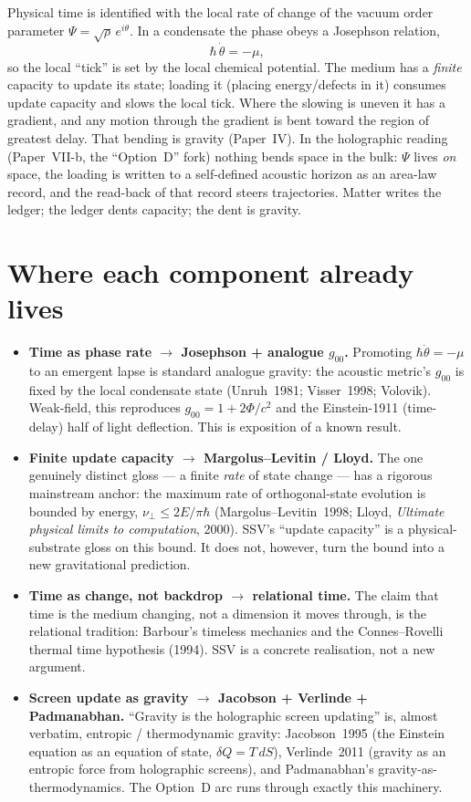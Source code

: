 \documentclass[11pt]{article}
\begin{document}
Physical time is identified with the local rate of change of the vacuum order
parameter $\Psi=\sqrt{\rho}\,e^{i\theta}$. In a condensate the phase obeys a
Josephson relation,
\begin{equation}
  \hbar\,\dot\theta = -\mu ,
\end{equation}
so the local ``tick'' is set by the local chemical potential. The medium has a
\emph{finite} capacity to update its state; loading it (placing energy/defects in
it) consumes update capacity and slows the local tick. Where the slowing is
uneven it has a gradient, and any motion through the gradient is bent toward the
region of greatest delay. That bending is gravity (Paper~IV). In the holographic
reading (Paper~VII-b, the ``Option~D'' fork) nothing bends space in the bulk:
$\Psi$ lives \emph{on} space, the loading is written to a self-defined acoustic
horizon as an area-law record, and the read-back of that record steers
trajectories. Matter writes the ledger; the ledger dents capacity; the dent is
gravity.

\section{Where each component already lives}

\begin{itemize}[leftmargin=1.4em]
\item \textbf{Time as phase rate $\to$ Josephson + analogue $g_{00}$.} Promoting
  $\hbar\dot\theta=-\mu$ to an emergent lapse is standard analogue gravity: the
  acoustic metric's $g_{00}$ is fixed by the local condensate state
  (Unruh~1981; Visser~1998; Volovik). Weak-field, this reproduces
  $g_{00}=1+2\Phi/c^2$ and the Einstein-1911 (time-delay) half of light
  deflection. This is exposition of a known result.
\item \textbf{Finite update capacity $\to$ Margolus--Levitin / Lloyd.} The one
  genuinely distinct gloss --- a finite \emph{rate} of state change --- has a
  rigorous mainstream anchor: the maximum rate of orthogonal-state evolution is
  bounded by energy, $\nu_\perp \le 2E/\pi\hbar$ (Margolus--Levitin~1998;
  Lloyd, \emph{Ultimate physical limits to computation}, 2000). SSV's ``update
  capacity'' is a physical-substrate gloss on this bound. It does not, however,
  turn the bound into a new gravitational prediction.
\item \textbf{Time as change, not backdrop $\to$ relational time.} The claim that
  time is the medium changing, not a dimension it moves through, is the
  relational tradition: Barbour's timeless mechanics and the Connes--Rovelli
  thermal time hypothesis (1994). SSV is a concrete realisation, not a new
  argument.
\item \textbf{Screen update as gravity $\to$ Jacobson + Verlinde + Padmanabhan.}
  ``Gravity is the holographic screen updating'' is, almost verbatim, entropic /
  thermodynamic gravity: Jacobson~1995 (the Einstein equation as an equation of
  state, $\delta Q = T\,dS$), Verlinde~2011 (gravity as an entropic force from
  holographic screens), and Padmanabhan's gravity-as-thermodynamics. The
  Option~D arc runs through exactly this machinery.
\end{itemize}
\end{document}
